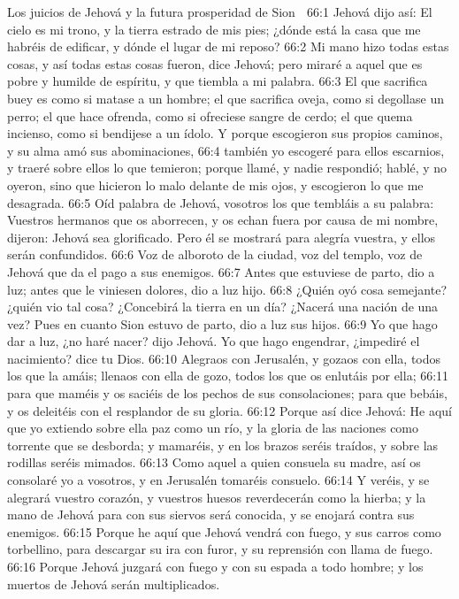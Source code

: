 Los juicios de Jehová y la futura prosperidad de Sion  

66:1 Jehová dijo así: El cielo es mi trono, y la tierra estrado de mis pies; ¿dónde está la casa que me habréis de edificar, y dónde el lugar de mi reposo? 
66:2 Mi mano hizo todas estas cosas, y así todas estas cosas fueron, dice Jehová; pero miraré a aquel que es pobre y humilde de espíritu, y que tiembla a mi palabra.  
66:3 El que sacrifica buey es como si matase a un hombre; el que sacrifica oveja, como si degollase un perro; el que hace ofrenda, como si ofreciese sangre de cerdo; el que quema incienso, como si bendijese a un ídolo. Y porque escogieron sus propios caminos, y su alma amó sus abominaciones,  
66:4 también yo escogeré para ellos escarnios, y traeré sobre ellos lo que temieron; porque llamé, y nadie respondió; hablé, y no oyeron, sino que hicieron lo malo delante de mis ojos, y escogieron lo que me desagrada.  
66:5 Oíd palabra de Jehová, vosotros los que tembláis a su palabra: Vuestros hermanos que os aborrecen, y os echan fuera por causa de mi nombre, dijeron: Jehová sea glorificado. Pero él se mostrará para alegría vuestra, y ellos serán confundidos.  
66:6 Voz de alboroto de la ciudad, voz del templo, voz de Jehová que da el pago a sus enemigos.  
66:7 Antes que estuviese de parto, dio a luz; antes que le viniesen dolores, dio a luz hijo. 
66:8 ¿Quién oyó cosa semejante? ¿quién vio tal cosa? ¿Concebirá la tierra en un día? ¿Nacerá una nación de una vez? Pues en cuanto Sion estuvo de parto, dio a luz sus hijos.  
66:9 Yo que hago dar a luz, ¿no haré nacer? dijo Jehová. Yo que hago engendrar, ¿impediré el nacimiento? dice tu Dios.  
66:10 Alegraos con Jerusalén, y gozaos con ella, todos los que la amáis; llenaos con ella de gozo, todos los que os enlutáis por ella;  
66:11 para que maméis y os saciéis de los pechos de sus consolaciones; para que bebáis, y os deleitéis con el resplandor de su gloria.  
66:12 Porque así dice Jehová: He aquí que yo extiendo sobre ella paz como un río, y la gloria de las naciones como torrente que se desborda; y mamaréis, y en los brazos seréis traídos, y sobre las rodillas seréis mimados.  
66:13 Como aquel a quien consuela su madre, así os consolaré yo a vosotros, y en Jerusalén tomaréis consuelo.  
66:14 Y veréis, y se alegrará vuestro corazón, y vuestros huesos reverdecerán como la hierba; y la mano de Jehová para con sus siervos será conocida, y se enojará contra sus enemigos.  
66:15 Porque he aquí que Jehová vendrá con fuego, y sus carros como torbellino, para descargar su ira con furor, y su reprensión con llama de fuego.  
66:16 Porque Jehová juzgará con fuego y con su espada a todo hombre; y los muertos de Jehová serán multiplicados.  
